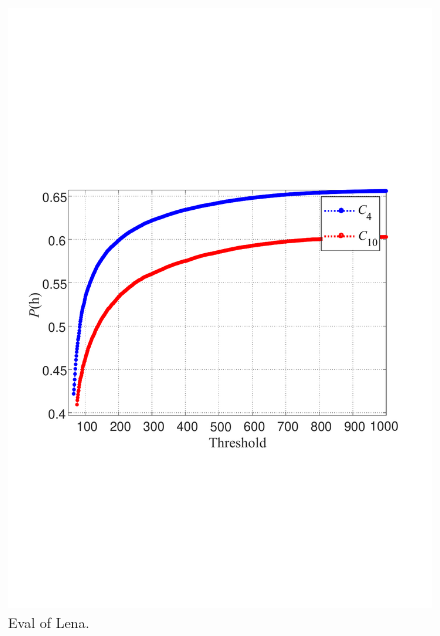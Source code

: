\documentclass[review,3p,10pt,sort&compress]{elsarticle}
\begin{document}
\begin{figure}
{\begin{minipage}[t]{0.46\linewidth}
    \includegraphics[width=1\textwidth]{figures/thPropLena.pdf}
    \end{minipage}
}
\centering
\caption{Eval of Lena.}
\label{Fig.Eval}
\end{figure}
\end{document}
